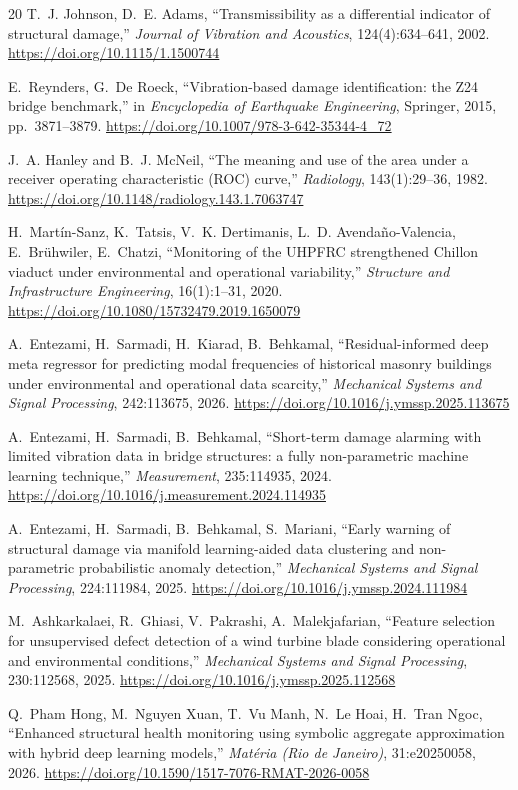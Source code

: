 \documentclass[11pt,a4paper]{article}
\begin{document}
\begin{thebibliography}{20}
T.~J. Johnson, D.~E. Adams,
``Transmissibility as a differential indicator of structural damage,''
\emph{Journal of Vibration and Acoustics}, 124(4):634--641, 2002.
\url{https://doi.org/10.1115/1.1500744}

E.~Reynders, G.~De Roeck,
``Vibration-based damage identification: the Z24 bridge benchmark,''
in \emph{Encyclopedia of Earthquake Engineering}, Springer, 2015,
pp.~3871--3879.
\url{https://doi.org/10.1007/978-3-642-35344-4_72}

J.~A. Hanley and B.~J. McNeil,
``The meaning and use of the area under a receiver operating characteristic
(ROC) curve,''
\emph{Radiology}, 143(1):29--36, 1982.
\url{https://doi.org/10.1148/radiology.143.1.7063747}

\color{red}
H.~Mart\'in-Sanz, K.~Tatsis, V.~K. Dertimanis, L.~D. Avenda\~no-Valencia,
E.~Br\"uhwiler, E.~Chatzi,
``Monitoring of the UHPFRC strengthened Chillon viaduct under environmental
and operational variability,''
\emph{Structure and Infrastructure Engineering}, 16(1):1--31, 2020.
\url{https://doi.org/10.1080/15732479.2019.1650079}

A.~Entezami, H.~Sarmadi, H.~Kiarad, B.~Behkamal,
``Residual-informed deep meta regressor for predicting modal frequencies of
historical masonry buildings under environmental and operational data
scarcity,''
\emph{Mechanical Systems and Signal Processing}, 242:113675, 2026.
\url{https://doi.org/10.1016/j.ymssp.2025.113675}

A.~Entezami, H.~Sarmadi, B.~Behkamal,
``Short-term damage alarming with limited vibration data in bridge
structures: a fully non-parametric machine learning technique,''
\emph{Measurement}, 235:114935, 2024.
\url{https://doi.org/10.1016/j.measurement.2024.114935}

A.~Entezami, H.~Sarmadi, B.~Behkamal, S.~Mariani,
``Early warning of structural damage via manifold learning-aided data
clustering and non-parametric probabilistic anomaly detection,''
\emph{Mechanical Systems and Signal Processing}, 224:111984, 2025.
\url{https://doi.org/10.1016/j.ymssp.2024.111984}

M.~Ashkarkalaei, R.~Ghiasi, V.~Pakrashi, A.~Malekjafarian,
``Feature selection for unsupervised defect detection of a wind turbine
blade considering operational and environmental conditions,''
\emph{Mechanical Systems and Signal Processing}, 230:112568, 2025.
\url{https://doi.org/10.1016/j.ymssp.2025.112568}

Q.~Pham Hong, M.~Nguyen Xuan, T.~Vu Manh, N.~Le Hoai, H.~Tran Ngoc,
``Enhanced structural health monitoring using symbolic aggregate
approximation with hybrid deep learning models,''
\emph{Mat\'eria (Rio de Janeiro)}, 31:e20250058, 2026.
\url{https://doi.org/10.1590/1517-7076-RMAT-2026-0058}
\color{black}

\end{thebibliography}
\end{document}

